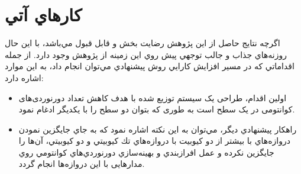 \section{كارهاي آتي}
اگرچه نتايج حاصل از اين پژوهش رضايت بخش و قابل قبول مي‌باشد، با اين حال روزنه‌هاي جذاب و جالب توجهي پيش روي اين زمينه از پژوهش وجود دارد. از جمله اقداماتي كه در مسير افزايش كارايي روش پيشنهادي مي‌توان انجام داد، به اين موارد اشاره دارد:
\begin{itemize}
\item
اولين اقدام، طراحی یک سیستم توزیع شده با هدف کاهش تعداد دورنوردی‌های کوانتومی در یک سطح است به طوری که بتوان دو سطح را با یکدیگر ادغام نمود. 
\item
راهكار پيشنهادي ديگر، مي‌توان به اين نكته اشاره نمود كه به جاي جايگزين نمودن دروازه‌هاي با بيشتر از دو كيوبيت با دروازه‌هاي تك كيوبيتي و دو كيوبيتي، آن‌ها را جايگزين نکرده و عمل افرازبندي و بهينه‌سازي دورنوردي‌هاي كوانتومي روي مدارهایی با اين دروازه‌ها انجام گردد.
 \end{itemize}

